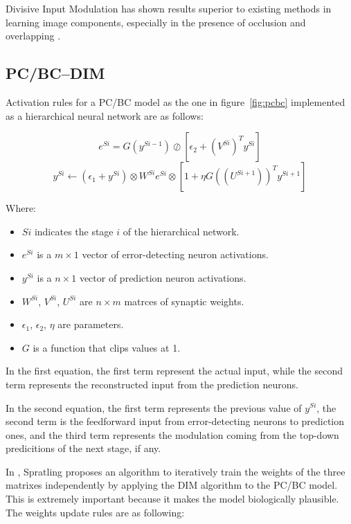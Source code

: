 \documentclass[11pt,a4paper]{report}
\begin{document}
			Divisive Input Modulation has shown results superior to existing methods in learning image components, especially in the presence of occlusion and overlapping \cite{spratling2009unsupervised}.
			
			\subsection{PC/BC--DIM}
				Activation rules for a PC/BC model as the one in figure~\ref{fig:pcbc} implemented as a hierarchical neural network are as follows:
				
				$$e^{Si} = G(y^{Si-1}) \oslash [\epsilon_2 + (V^{Si})^T y^{Si}]$$
				$$y^{Si} \leftarrow (\epsilon_1 + y^{Si}) \otimes W^{Si}e^{Si} \otimes [1 + \eta G((U^{Si+1}))^T y^{Si+1}]$$
				
				Where:
				\begin{itemize}
					\item $Si$ indicates the stage $i$ of the hierarchical network.
					\item $e^{Si}$ is a $m \times 1$ vector of error-detecting neuron activations.
					\item $y^{Si}$ is a $n \times 1$ vector of prediction neuron activations.
					\item $W^{Si}$, $V^{Si}$, $U^{Si}$ are $n \times m$ matrces of synaptic weights.
					\item $\epsilon_1$, $\epsilon_2$, $\eta$ are parameters.
					\item $G$ is a function that clips values at 1. 
				\end{itemize}
				
				In the first equation, the first term represent the actual input, while the second term represents the reconstructed input from the prediction neurons.
				
				In the second equation, the first term represents the previous value of $y^{Si}$, the second term is the feedforward input from error-detecting neurons to prediction ones, and the third term represents the modulation coming from the top-down predicitions of the next stage, if any.
				
				In \cite{spratling2012unsupervised}, Spratling proposes an algorithm to iteratively train the weights of the three matrixes independently by applying the DIM algorithm to the PC/BC model. This is extremely important because it makes the model biologically plausible. The weights update rules are as following:
				
\end{document}
